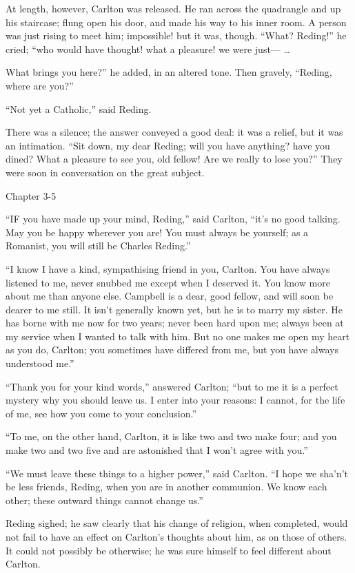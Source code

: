 At length, however, Carlton was released. He ran across the
quadrangle and up his staircase; flung open his door, and made his way
to his inner room. A person was just rising to meet him; impossible!
but it was, though. ``What? Reding!'' he cried; ``who
would have thought! what a pleasure! we were just— …

What brings you here?'' he added, in an altered tone. Then
gravely, ``Reding, where are you?''

``Not yet a Catholic,'' said Reding.

There was a silence; the answer conveyed a good deal: it was a
relief, but it was an intimation. ``Sit down, my dear Reding; will
you have anything? have you dined? What a pleasure to see you, old
fellow! Are we really to lose you?'' They were soon in
conversation on the great subject.

Chapter 3-5


``IF you have made up your mind,
Reding,'' said Carlton, ``it's no good talking. May you be
happy wherever you are! You must always be yourself; as a Romanist,
you will still be Charles Reding.''

``I know I have a kind, sympathising friend in you, Carlton.
You have always listened to me, never snubbed me except when I
deserved it. You know more about me than anyone else. Campbell is a
dear, good fellow, and will soon be dearer to me still. It isn't
generally known yet, but he is to marry my sister. He has borne with
me now for two years; never been hard upon me; always been at my
service when I wanted to talk with him. But no one makes me open my
heart as you do, Carlton; you sometimes have differed from me, but you
have always understood me.''

``Thank you for your kind words,'' answered Carlton;
``but to me it is a perfect mystery why you should leave us. I
enter into your reasons: I cannot, for the life of me, see how you
come to your conclusion.''

``To me, on the other hand, Carlton, it is like two and two
make four; and you make two and two five and are astonished that I won't
agree with you.''

``We must leave these things to a higher power,'' said
Carlton. ``I hope we sha'n't be less friends, Reding, when you are
in another communion. We know each other; these outward things cannot
change us.''

Reding sighed; he saw clearly that his change of religion, when
completed, would not fail to have an effect on Carlton's thoughts
about him, as on those of others. It could not possibly be otherwise;
he was sure himself to feel different about Carlton.

